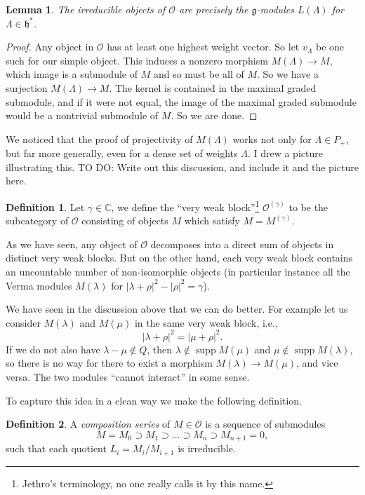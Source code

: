\documentclass[12pt]{article}
\theoremstyle{plain}
\newtheorem{lemma}[thm]{Lemma}
\theoremstyle{definition}
\newtheorem{defn}{Definition}[section]
\numberwithin{equation}{section}
\DeclareMathOperator{\supp}{supp}
\newcommand{\la}{\lambda}
\newcommand{\La}{\Lambda}
\newcommand{\C}{\mathbb{C}}
\newcommand{\g}{\mathfrak{g}}
\newcommand{\h}{\mathfrak{h}}
\newcommand{\OO}{\mathcal{O}}
\begin{document}
\begin{lemma}
The irreducible objects of $\OO$ are precisely the $\g$-modules $L(\La)$ for $\La \in \h^*$.
\end{lemma}

\begin{proof}
Any object in $\OO$ has at least one highest weight vector. So let $v_\La$ be one such for our simple object. This induces a nonzero morphism $M(\La) \rightarrow M$, which image is a submodule of $M$ and so must be all of $M$. So we have a surjection $M(\La) \rightarrow M$. The kernel is contained in the maximal graded submodule, and if it were not equal, the image of the maximal graded submodule would be a nontrivial submodule of $M$. So we are done.
\end{proof}


{\color{red}We noticed that the proof of projectivity of $M(\La)$ works not only for $\La \in P_+$, but far more generally, even for a dense set of weights $\La$. I drew a picture illustrating this. TO DO: Write out this discussion, and include it and the picture here.}


\begin{defn}
Let $\gamma \in \C$, we define the ``very weak block''\footnote{Jethro's terminology, no one really calls it by this name.} $\OO^{(\gamma)}$ to be the subcategory of $\OO$ consisting of objects $M$ which satisfy $M = M^{(\gamma)}$.
\end{defn}
As we have seen, any object of $\OO$ decomposes into a direct sum of objects in distinct very weak blocks. But on the other hand, each very weak block contains an uncountable number of non-isomorphic objects (in particular instance all the Verma modules $M(\la)$ for $|\la+\rho|^2-|\rho|^2 = \gamma$).

We have seen in the discussion above that we can do better. For example let us consider $M(\la)$ and $M(\mu)$ in the same very weak block, i.e.,
\[
|\la+\rho|^2 = |\mu+\rho|^2.
\]
If we do not also have $\la-\mu \notin Q$, then $\la \notin \supp M(\mu)$ and $\mu \notin \supp M(\la)$, so there is no way for there to exist a morphism $M(\la) \rightarrow M(\mu)$, and vice versa. The two modules ``cannot interact'' in some sense.



To capture this idea in a clean way we make the following definition.
\begin{defn}
A \emph{composition series} of $M \in \OO$ is a sequence of submodules
\[
M = M_0 \supset M_1 \supset \ldots \supset M_n \supset M_{n+1} = 0,
\]
such that each quotient $L_i = M_i / M_{i+1}$ is irreducible.
\end{defn}
\end{document}
